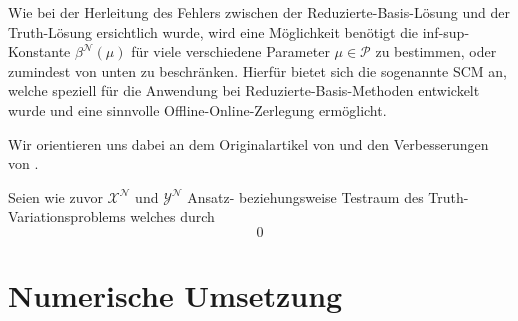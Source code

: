 \documentclass[../main.tex]{subfiles}
\begin{document}
Wie bei der Herleitung des Fehlers zwischen der Reduzierte-Basis-Lösung und der Truth-Lösung ersichtlich wurde, wird eine Möglichkeit benötigt die inf-sup-Konstante $\beta^{\mathcal N}(\mu)$ für viele verschiedene Parameter $\mu \in \mathcal P$ zu bestimmen, oder zumindest von unten zu beschränken.
Hierfür bietet sich die sogenannte \ac{SCM} an, welche speziell für die Anwendung bei Reduzierte-Basis-Methoden entwickelt wurde und eine sinnvolle Offline-Online-Zerlegung ermöglicht.

Wir orientieren uns dabei an dem Originalartikel von \textcite{Huynh2007} und den Verbesserungen von \textcite{Chen2009}.

Seien wie zuvor $\mathcal X^{\mathcal N}$ und $\mathcal Y^{\mathcal N}$ Ansatz- beziehungsweise Testraum des Truth-Variationsproblems welches durch
\begin{equation}
0
\end{equation}




\section{Numerische Umsetzung} %
\label{sub:grb:rb:numerische_umsetzung}



\end{document}
